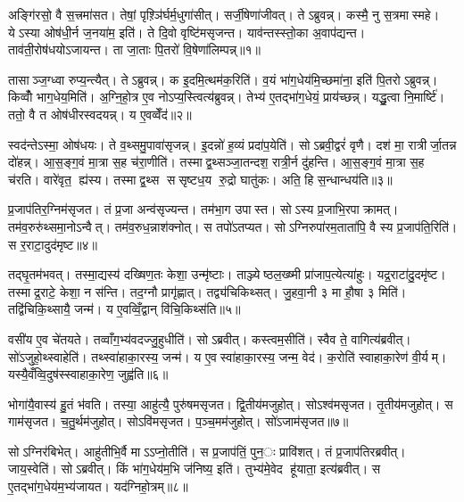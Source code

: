 अङ्गि॑रसो॒ वै स॒त्त्रमा॑सत। तेषां॒ पृश़्ञि॑र्घर्म॒धुगा॑सीत्। सर्जी॒षेणा॑जीवत्। तेऽब्रुवन्न्। कस्मै॒ नु स॒त्रमास्महे। येऽस्या ओष॑धी॒र्न ज॒नया॑म॒ इति॑। ते दि॒वो वृष्टि॑मसृजन्त। याव॑न्तस्स्तो॒का अ॒वाप॑द्यन्त। ताव॑ती॒रोष॑धयोऽजायन्त। ता जा॒ताः पि॒तरो॑ वि॒षेणा॑लिम्पन्न्॥१॥

तासाञ्ज॒ग्ध्वा रुप्य॒न्त्यैत्। तेऽब्रुवन्न्। क इ॒दमि॒त्थम॑क॒रिति॑। व॒यं भा॑ग॒धेय॑मि॒च्छमा॑ना॒ इति॑ पि॒तरोऽब्रुवन्न्। किव्वोँ॑ भाग॒धेय॒मिति॑। अ॒ग्नि॒हो॒त्र ए॒व नोऽप्य॒स्त्वित्य॑ब्रुवन्न्। तेभ्य॑ ए॒तद्भा॑ग॒धेयं॒ प्राय॑च्छन्न्। यद्धु॒त्वा नि॒मार्ष्टि॑। ततो॒ वै त ओष॑धीरस्वदयन्न्। य ए॒वव्वेँद॑॥२॥

स्वद॑न्तेऽस्मा॒ ओष॑धयः। ते व॒थ्समु॒पावा॑सृजन्न्। इ॒दन्नो॑ ह॒व्यं प्रदा॑प॒येति॑। सोऽब्रवी॒द्वरं॑ वृणै। दश॑ मा॒ रात्रीर्जा॒तन्न दो॑हन्न्। आ॒स॒ङ्ग॒वं मा॒त्रा स॒ह च॑रा॒णीति॑। तस्माद्व॒थ्सञ्जा॒तन्दश॒ रात्री॒र्न दु॑हन्ति। आ॒स॒ङ्ग॒वं मा॒त्रा स॒ह च॑रति। वारे॑वृत॒ ह्य॑स्य। तस्माद्व॒थ्स ससृष्टध॒य रु॒द्रो घातु॑कः। अति॒ हि स॒न्धान्धय॑ति॥३॥


प्र॒जाप॑तिर॒ग्निम॑सृजत। तं प्र॒जा अन्व॑सृज्यन्त। तम॑भा॒ग उपास्त। सोऽस्य प्र॒जाभि॒रपाक्रामत्। तम॑व॒रुरु॑थ्समा॒नोऽन्वैत्। तम॑व॒रुध॒न्नाश॑क्नोत्। स तपो॑ऽतप्यत। सोऽग्निरुपा॑रम॒ताता॑पि॒ वै स्य प्र॒जाप॑ति॒रिति॑। स र॒राटा॒दुद॑मृष्ट॥४॥

तद्घृ॒तम॑भवत्। तस्मा॒द्यस्य॑ दख्षिण॒तः केशा॒ उन्मृ॑ष्टाः। ताञ्ज्येष्ठल॒ख्ष्मी प्रा॑जाप॒त्येत्या॑हुः। यद्र॒राटा॑दु॒दमृ॑ष्ट। तस्माद्र॒राटे॒ केशा॒ न स॑न्ति। तद॒ग्नौ प्रागृ॑ह्णात्। तद्व्य॑चिकिथ्सत्। जु॒हवा॒नी ३ मा हौ॒षा ३ मिति॑। तद्वि॑चिकि॒थ्सायै॒ जन्म॑। य ए॒वव्विँ॒द्वान् वि॑चि॒किथ्स॑ति॥५॥

वसी॑य ए॒व चे॑तयते। तव्वाँग॒भ्य॑वदज्जु॒हुधीति॑। सोऽब्रवीत्। कस्त्वम॒सीति॑। स्वैव ते॒ वागित्य॑ब्रवीत्। सो॑ऽजुहो॒थ्स्वाहेति॑। तथ्स्वा॑हाका॒रस्य॒ जन्म॑। य ए॒वस्वा॑हाका॒रस्य॒ जन्म॒ वेद॑। क॒रोति॑ स्वाहाका॒रेण॑ वी॒र्यम्। यस्यै॒वँव्वि॒दुष॑स्स्वाहाका॒रेण॒ जुह्व॑ति॥६॥

भोगा॑यै॒वास्य॑ हु॒तं भ॑वति। तस्या॒ आहु॑त्यै॒ पुरु॑षमसृजत। द्वि॒तीय॑मजुहोत्। सोऽश्व॑मसृजत। तृ॒तीय॑मजुहोत्। स गाम॑सृजत। च॒तु॒र्थम॑जुहोत्। सोऽवि॑मसृजत। प॒ञ्च॒मम॑जुहोत्। सो॑ऽजाम॑सृजत॥७॥

सोऽग्निर॑बिभेत्। आहु॑तीभि॒र्वै माऽऽप्नो॒तीति॑। स प्र॒जाप॑तिं॒ पुन॒ः प्रावि॑शत्। तं प्र॒जाप॑तिरब्रवीत्। जाय॒स्वेति॑। सोऽब्रवीत्। किं भा॑ग॒धेय॑म॒भि ज॑निष्य॒ इति॑। तुभ्य॑मे॒वेद हू॑याता॒ इत्य॑ब्रवीत्। स ए॒तद्भा॑ग॒धेय॑म॒भ्य॑जायत। यद॑ग्निहो॒त्रम्॥८॥


